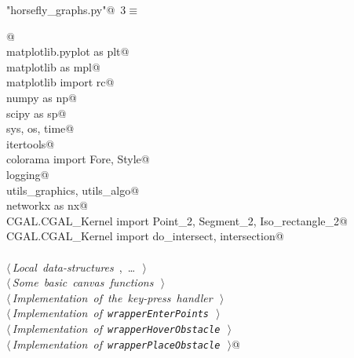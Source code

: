 \documentclass[11.5pt]{report}
\begin{document}
\begin{flushleft} \small\label{scrap1}\raggedright\small
{} \verb@"horsefly_graphs.py"@\nobreak\ {\footnotesize {3}}$\equiv$
\vspace{-1ex}
\begin{list}{}{} \item
\mbox{}\verb@    @\\
\mbox{}\verb@import matplotlib.pyplot as plt@\\
\mbox{}\verb@import matplotlib as mpl@\\
\mbox{}\verb@from matplotlib import rc@\\
\mbox{}\verb@import numpy as np@\\
\mbox{}\verb@import scipy as sp@\\
\mbox{}\verb@import sys, os, time@\\
\mbox{}\verb@import itertools@\\
\mbox{}\verb@from colorama import Fore, Style@\\
\mbox{}\verb@import logging@\\
\mbox{}\verb@import utils_graphics, utils_algo@\\
\mbox{}\verb@import networkx as nx@\\
\mbox{}\verb@from CGAL.CGAL_Kernel import Point_2, Segment_2, Iso_rectangle_2@\\
\mbox{}\verb@from CGAL.CGAL_Kernel import do_intersect, intersection@\\
\mbox{}\verb@@\\
\mbox{}\verb@@\hbox{$\langle\,${\itshape Local data-structures}\nobreak\ {\footnotesize {}, \ldots\ }$\,\rangle$}\verb@@\\
\mbox{}\verb@@\hbox{$\langle\,${\itshape Some basic canvas functions}\nobreak\ {\footnotesize {}}$\,\rangle$}\verb@@\\
\mbox{}\verb@@\hbox{$\langle\,${\itshape Implementation of the key-press handler}\nobreak\ {\footnotesize {}}$\,\rangle$}\verb@@\\
\mbox{}\verb@@\hbox{$\langle\,${\itshape Implementation of \verb|wrapperEnterPoints|}\nobreak\ {\footnotesize {}}$\,\rangle$}\verb@@\\
\mbox{}\verb@@\hbox{$\langle\,${\itshape Implementation of \verb|wrapperHoverObstacle|}\nobreak\ {\footnotesize {}}$\,\rangle$}\verb@@\\
\mbox{}\verb@@\hbox{$\langle\,${\itshape Implementation of \verb|wrapperPlaceObstacle|}\nobreak\ {\footnotesize {}}$\,\rangle$}\verb@   @\\

\end{list}
\end{flushleft}
\end{document}

